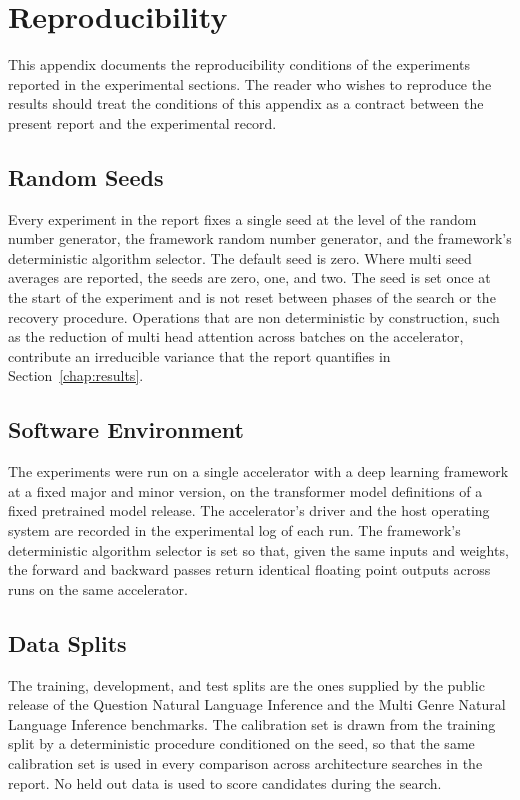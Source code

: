 \section{Reproducibility}
\label{app:repro}

This appendix documents the reproducibility conditions of the experiments reported in the experimental sections. The reader who wishes to reproduce the results should treat the conditions of this appendix as a contract between the present report and the experimental record.

\subsection{Random Seeds}

Every experiment in the report fixes a single seed at the level of the random number generator, the framework random number generator, and the framework's deterministic algorithm selector. The default seed is zero. Where multi seed averages are reported, the seeds are zero, one, and two. The seed is set once at the start of the experiment and is not reset between phases of the search or the recovery procedure. Operations that are non deterministic by construction, such as the reduction of multi head attention across batches on the accelerator, contribute an irreducible variance that the report quantifies in Section~\ref{chap:results}.

\subsection{Software Environment}

The experiments were run on a single accelerator with a deep learning framework at a fixed major and minor version, on the transformer model definitions of a fixed pretrained model release. The accelerator's driver and the host operating system are recorded in the experimental log of each run. The framework's deterministic algorithm selector is set so that, given the same inputs and weights, the forward and backward passes return identical floating point outputs across runs on the same accelerator.

\subsection{Data Splits}

The training, development, and test splits are the ones supplied by the public release of the Question Natural Language Inference and the Multi Genre Natural Language Inference benchmarks. The calibration set is drawn from the training split by a deterministic procedure conditioned on the seed, so that the same calibration set is used in every comparison across architecture searches in the report. No held out data is used to score candidates during the search.

